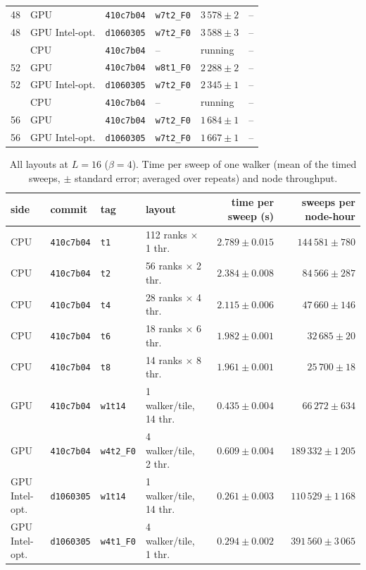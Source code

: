 \begin{table}[h]
\begin{tabular}{@{}rllllr@{}}
48 & GPU & \texttt{410c7b04} & \texttt{w7t2\_F0} & $3\,578 \pm 2$ & --\\
48 & GPU Intel-opt. & \texttt{d1060305} & \texttt{w7t2\_F0} & $3\,588 \pm 3$ & --\\
\addlinespace
52 & CPU & \texttt{410c7b04} & -- & running & --\\
52 & GPU & \texttt{410c7b04} & \texttt{w8t1\_F0} & $2\,288 \pm 2$ & --\\
52 & GPU Intel-opt. & \texttt{d1060305} & \texttt{w7t2\_F0} & $2\,345 \pm 1$ & --\\
\addlinespace
56 & CPU & \texttt{410c7b04} & -- & running & --\\
56 & GPU & \texttt{410c7b04} & \texttt{w7t2\_F0} & $1\,684 \pm 1$ & --\\
56 & GPU Intel-opt. & \texttt{d1060305} & \texttt{w7t2\_F0} & $1\,667 \pm 1$ & --\\
\bottomrule\end{tabular}\end{table}
\begin{table}[h]\centering\small
\caption{All layouts at $L=16$ ($\beta=4$). Time per sweep of one walker (mean of the timed sweeps, $\pm$ standard error; averaged over repeats) and node throughput.}
\begin{tabular}{@{}llllrr@{}}\toprule
side & commit & tag & layout & time per sweep (s) & sweeps per node-hour\\\midrule
CPU & \texttt{410c7b04} & \texttt{t1} & 112 ranks $\times$ 1 thr. & $2.789 \pm 0.015$ & $144\,581 \pm 780$\\
CPU & \texttt{410c7b04} & \texttt{t2} & 56 ranks $\times$ 2 thr. & $2.384 \pm 0.008$ & $84\,566 \pm 287$\\
CPU & \texttt{410c7b04} & \texttt{t4} & 28 ranks $\times$ 4 thr. & $2.115 \pm 0.006$ & $47\,660 \pm 146$\\
CPU & \texttt{410c7b04} & \texttt{t6} & 18 ranks $\times$ 6 thr. & $1.982 \pm 0.001$ & $32\,685 \pm 20$\\
CPU & \texttt{410c7b04} & \texttt{t8} & 14 ranks $\times$ 8 thr. & $1.961 \pm 0.001$ & $25\,700 \pm 18$\\
GPU & \texttt{410c7b04} & \texttt{w1t14} & 1 walker/tile, 14 thr. & $0.435 \pm 0.004$ & $66\,272 \pm 634$\\
GPU & \texttt{410c7b04} & \texttt{w4t2\_F0} & 4 walker/tile, 2 thr. & $0.609 \pm 0.004$ & $189\,332 \pm 1\,205$\\
GPU Intel-opt. & \texttt{d1060305} & \texttt{w1t14} & 1 walker/tile, 14 thr. & $0.261 \pm 0.003$ & $110\,529 \pm 1\,168$\\
GPU Intel-opt. & \texttt{d1060305} & \texttt{w4t1\_F0} & 4 walker/tile, 1 thr. & $0.294 \pm 0.002$ & $391\,560 \pm 3\,065$\\
\bottomrule\end{tabular}\end{table}
